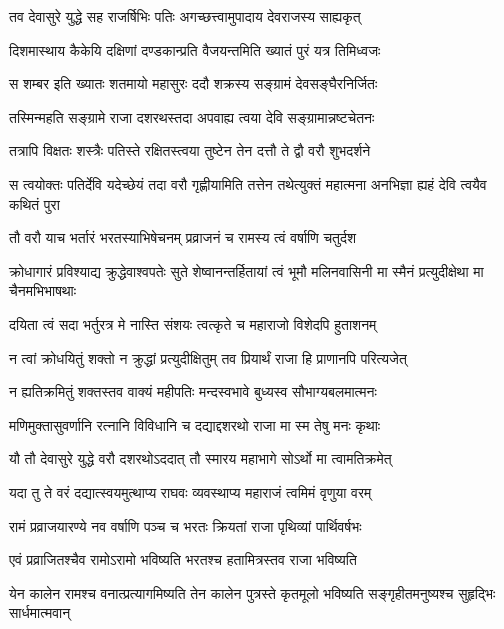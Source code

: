 \twolineshloka
{तव देवासुरे युद्धे सह राजर्षिभिः पतिः}
{अगच्छत्त्वामुपादाय देवराजस्य साह्यकृत्} %

\twolineshloka
{दिशमास्थाय कैकेयि दक्षिणां दण्डकान्प्रति}
{वैजयन्तमिति ख्यातं पुरं यत्र तिमिध्वजः} %

\twolineshloka
{स शम्बर इति ख्यातः शतमायो महासुरः}
{ददौ शक्रस्य सङ्ग्रामं देवसङ्घैरनिर्जितः} %

\twolineshloka
{तस्मिन्महति सङ्ग्रामे राजा दशरथस्तदा}
{अपवाह्य त्वया देवि सङ्ग्रामान्नष्टचेतनः} %

\twolineshloka
{तत्रापि विक्षतः शस्त्रैः पतिस्ते रक्षितस्त्वया}
{तुष्टेन तेन दत्तौ ते द्वौ वरौ शुभदर्शने} %

\threelineshloka
{स त्वयोक्तः पतिर्देवि यदेच्छेयं तदा वरौ}
{गृह्णीयामिति तत्तेन तथेत्युक्तं महात्मना}
{अनभिज्ञा ह्यहं देवि त्वयैव कथितं पुरा} %

\twolineshloka
{तौ वरौ याच भर्तारं भरतस्याभिषेचनम्}
{प्रव्राजनं च रामस्य त्वं वर्षाणि चतुर्दश} %

\threelineshloka
{क्रोधागारं प्रविश्याद्य क्रुद्धेवाश्वपतेः सुते}
{शेष्वानन्तर्हितायां त्वं भूमौ मलिनवासिनी}
{मा स्मैनं प्रत्युदीक्षेथा मा चैनमभिभाषथाः} %

\twolineshloka
{दयिता त्वं सदा भर्तुरत्र मे नास्ति संशयः}
{त्वत्कृते च महाराजो विशेदपि हुताशनम्} %

\twolineshloka
{न त्वां क्रोधयितुं शक्तो न क्रुद्धां प्रत्युदीक्षितुम्}
{तव प्रियार्थं राजा हि प्राणानपि परित्यजेत्} %

\twolineshloka
{न ह्यतिक्रमितुं शक्तस्तव वाक्यं महीपतिः}
{मन्दस्वभावे बुध्यस्व सौभाग्यबलमात्मनः} %

\twolineshloka
{मणिमुक्तासुवर्णानि रत्नानि विविधानि च}
{दद्याद्दशरथो राजा मा स्म तेषु मनः कृथाः} %

\twolineshloka
{यौ तौ देवासुरे युद्धे वरौ दशरथोऽददात्}
{तौ स्मारय महाभागे सोऽर्थो मा त्वामतिक्रमेत्} %

\twolineshloka
{यदा तु ते वरं दद्यात्स्वयमुत्थाप्य राघवः}
{व्यवस्थाप्य महाराजं त्वमिमं वृणुया वरम्} %

\twolineshloka
{रामं प्रव्राजयारण्ये नव वर्षाणि पञ्च च}
{भरतः क्रियतां राजा पृथिव्यां पार्थिवर्षभः} %

\twolineshloka
{एवं प्रव्राजितश्चैव रामोऽरामो भविष्यति}
{भरतश्च हतामित्रस्तव राजा भविष्यति} %

\threelineshloka
{येन कालेन रामश्च वनात्प्रत्यागमिष्यति}
{तेन कालेन पुत्रस्ते कृतमूलो भविष्यति}
{सङ्गृहीतमनुष्यश्च सुहृद्भिः सार्धमात्मवान्} %

